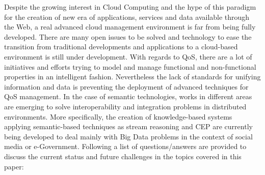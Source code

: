 Despite the growing interest in Cloud Computing and the hype of this 
paradigm for the creation of new era of applications, services and data 
available through the Web, a real advanced cloud management environment is far 
from being fully developed. There are many open issues to be solved and 
technology to ease the transition from traditional developments and applications 
to a cloud-based environment is still under development. With regards to QoS, 
there are a lot of initiatives and efforts trying to model and manage functional 
and non-functional properties in an intelligent fashion. Nevertheless the lack 
of standards for unifying information and data is preventing the deployment of 
advanced techniques for QoS management. In the case of semantic technologies, 
works in different areas are emerging to solve interoperability and integration 
problems in distributed environments. More specifically, the creation of 
knowledge-based systems applying semantic-based techniques as stream reasoning 
and CEP are currently being developed to deal mainly with Big Data problems in the 
context of social media or e-Government. Following a list of questions/answers 
are provided to discuss the current status and future challenges in the 
topics covered in this paper:
